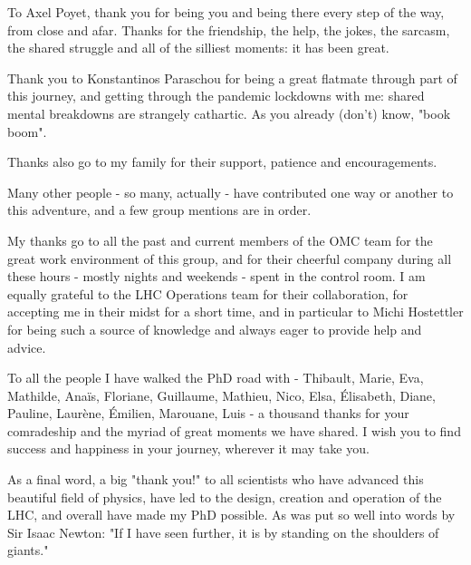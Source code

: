 \begin{acknowledgements}
To Axel Poyet, thank you for being you and being there every step of the way, from close and afar.
Thanks for the friendship, the help, the jokes, the sarcasm, the shared struggle and all of the silliest moments: it has been great.

Thank you to Konstantinos Paraschou for being a great flatmate through part of this journey, and getting through the pandemic lockdowns with me: shared mental breakdowns are strangely cathartic.
As you already (don't) know, "book boom".

Thanks also go to my family for their support, patience and encouragements.
\newline

Many other people - so many, actually - have contributed one way or another to this adventure, and a few group mentions are in order.

My thanks go to all the past and current members of the OMC team for the great work environment of this group, and for their cheerful company during all these hours - mostly nights and weekends - spent in the control room.
I am equally grateful to the LHC Operations team for their collaboration, for accepting me in their midst for a short time, and in particular to Michi Hostettler for being such a source of knowledge and always eager to provide help and advice.

To all the people I have walked the PhD road with - Thibault, Marie, Eva, Mathilde, Anaïs, Floriane, Guillaume, Mathieu, Nico, Elsa, Élisabeth, Diane, Pauline, Laurène, Émilien, Marouane, Luis - a thousand thanks for your comradeship and the myriad of great moments we have shared.
I wish you to find success and happiness in your journey, wherever it may take you.

As a final word, a big "thank you!" to all scientists who have advanced this beautiful field of physics, have led to the design, creation and operation of the LHC, and overall have made my PhD possible.
As was put so well into words by Sir Isaac Newton: "If I have seen further, it is by standing on the shoulders of giants."

\end{acknowledgements}